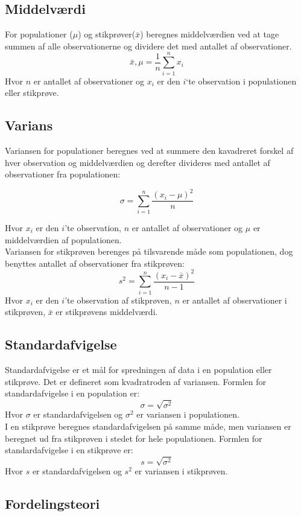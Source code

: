 \subsection{Middelværdi}
For populationer ($\mu$) og stikprøver($\bar{x}$) beregnes middelværdien  ved at tage summen af alle observationerne og dividere det med antallet af observationer.
\[\bar{x} , \mu = \frac{1}{n} \sum_{i=1}^{n} x_i\]
Hvor $n$ er antallet af observationer og $x_i$ er den $i$`te observation i populationen eller stikprøve. 

\subsection{Varians}
Variansen for populationer beregnes ved at summere den kavadreret forskel af hver observation og middelværdien og derefter divideres med antallet af observationer fra populationen:

\[\sigma = \sum_{i=1}^{n}\frac{(x_i-\mu)^2}{n}\]

\noindent Hvor $x_i$ er den $i$'te observation, $n$ er antallet af observationer og $\mu$ er middelværdien af populationen.
\\

\noindent Variansen for stikprøven berenges på tilsvarende måde som populationen, dog benyttes antallet af observationer fra stikprøven:
\[s^2 = \sum_{i=1}^{n}\frac{(x_i-\bar{x})^2}{n-1}\]
Hvor $x_i$ er den $i$'te observation af stikprøven, $n$ er antallet af observationer i stikprøven, $\bar{x}$ er stikprøvens middelværdi.

\subsection{Standardafvigelse}
Standardafvigelse er et mål for spredningen af data i en population eller stikprøve. Det er defineret som kvadratroden af variansen. Formlen for standardafvigelse i en population er:
\[\sigma = \sqrt{\sigma^2}\]
\noindent Hvor $\sigma$ er standardafvigelsen og $\sigma^2$ er variansen i populationen.
\\
I en stikprøve beregnes standardafvigelsen på samme måde, men variansen er beregnet ud fra stikprøven i stedet for hele populationen. Formlen for standardafvigelse i en stikprøve er:
\[s = \sqrt{\sigma^2}\]
Hvor $s$ er standardafvigelsen og $s^2$ er variansen i stikprøven.

\subsection{Fordelingsteori}
